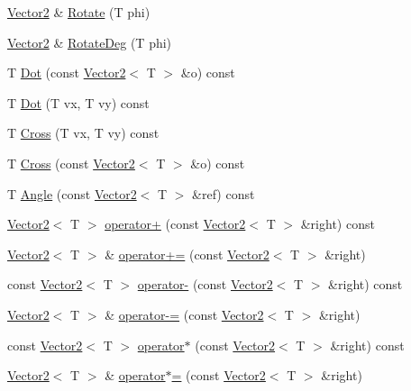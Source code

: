 \begin{DoxyCompactItemize}
\item 
\hyperlink{classastu_1_1Vector2}{Vector2} \& \hyperlink{classastu_1_1Vector2_ac2b10a554fede91faa5a0668ebe76697}{Rotate} (T phi)
\item 
\hyperlink{classastu_1_1Vector2}{Vector2} \& \hyperlink{classastu_1_1Vector2_a85d7593d86a8b74bb3a0a07b3d734ccd}{Rotate\+Deg} (T phi)
\item 
T \hyperlink{classastu_1_1Vector2_a44f449c9f23b8e5aa2739c3a50b57ceb}{Dot} (const \hyperlink{classastu_1_1Vector2}{Vector2}$<$ T $>$ \&o) const
\item 
T \hyperlink{classastu_1_1Vector2_a0fb863e03982e1583a0945873caf92d7}{Dot} (T vx, T vy) const
\item 
T \hyperlink{classastu_1_1Vector2_ad7245590bd3a503f0c388cad9008789b}{Cross} (T vx, T vy) const
\item 
T \hyperlink{classastu_1_1Vector2_ab39f342813a6f5f21a533a4345e1336c}{Cross} (const \hyperlink{classastu_1_1Vector2}{Vector2}$<$ T $>$ \&o) const
\item 
T \hyperlink{classastu_1_1Vector2_af44c9648648cb03637f520669e9a2d8e}{Angle} (const \hyperlink{classastu_1_1Vector2}{Vector2}$<$ T $>$ \&ref) const
\item 
\hyperlink{classastu_1_1Vector2}{Vector2}$<$ T $>$ \hyperlink{classastu_1_1Vector2_a1ebf3c3f9ef6c8e07f6ea2327a630fca}{operator+} (const \hyperlink{classastu_1_1Vector2}{Vector2}$<$ T $>$ \&right) const
\item 
\hyperlink{classastu_1_1Vector2}{Vector2}$<$ T $>$ \& \hyperlink{classastu_1_1Vector2_a285af566f7b2e4a218932094ab9a70f8}{operator+=} (const \hyperlink{classastu_1_1Vector2}{Vector2}$<$ T $>$ \&right)
\item 
const \hyperlink{classastu_1_1Vector2}{Vector2}$<$ T $>$ \hyperlink{classastu_1_1Vector2_a694ff874fcdb2118ed665a7cb28978e9}{operator-\/} (const \hyperlink{classastu_1_1Vector2}{Vector2}$<$ T $>$ \&right) const
\item 
\hyperlink{classastu_1_1Vector2}{Vector2}$<$ T $>$ \& \hyperlink{classastu_1_1Vector2_a7022d1b830ee06d272a05d7d52c93a53}{operator-\/=} (const \hyperlink{classastu_1_1Vector2}{Vector2}$<$ T $>$ \&right)
\item 
const \hyperlink{classastu_1_1Vector2}{Vector2}$<$ T $>$ \hyperlink{classastu_1_1Vector2_a5ee8479488e6da2a82110f2ac62d386f}{operator$\ast$} (const \hyperlink{classastu_1_1Vector2}{Vector2}$<$ T $>$ \&right) const
\item 
\hyperlink{classastu_1_1Vector2}{Vector2}$<$ T $>$ \& \hyperlink{classastu_1_1Vector2_a3416fb656aef7113d0261533f5a8a4aa}{operator$\ast$=} (const \hyperlink{classastu_1_1Vector2}{Vector2}$<$ T $>$ \&right)

\end{DoxyCompactItemize}
